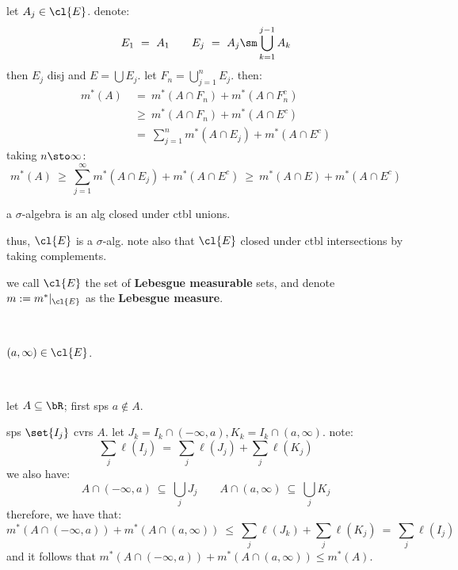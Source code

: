 \begin{pf}
	let $A_{j}\in\cl{E}$. denote:
	\begin{equation*}
		E_{1} \ = \ A_{1} \qquad E_{j} \ = \ A_{j}\sm \bigcup_{k=1}^{j-1}A_{k}
	\end{equation*}
	then $E_{j}$ disj and $E=\bigcup E_{j}$.
	let $F_{n}=\bigcup_{j=1}^{n}E_{j}$. then:
	\begin{align*}
		m^{*}(A)
		& \ = \ m^{*}(A\cap F_{n}) + m^{*}(A\cap F_{n}^{c}) \\
		& \ \geq \ m^{*}(A\cap F_{n}) + m^{*}(A\cap E^{c}) \\
		& \ = \ \sum_{j=1}^{n}m^{*}(A\cap E_{j}) + m^{*}(A\cap E^{c})
	\end{align*}
	taking $n\sto\infty$:
	\begin{equation*}
		m^{*}(A) \ \geq \ \sum_{j=1}^{\infty}m^{*}(A\cap E_{j})+m^{*}(A\cap E^{c})
		\ \geq \ m^{*}(A\cap E) + m^{*}(A\cap E^{c})
	\end{equation*}
\end{pf}

\begin{defn}
	a $\sigma$-algebra is an alg closed under ctbl unions.
\end{defn}
thus, $\cl{E}$ is a $\sigma$-alg.
note also that $\cl{E}$ closed under ctbl intersections by taking complements.

\begin{defn}
	we call $\cl{E}$ the set of \textbf{Lebesgue measurable} sets, and denote $m:=m^{*}\rvert_{\cl{E}}$
	as the \textbf{Lebesgue measure}.
\end{defn} \

\begin{lm}
	$(a,\infty)\in\cl{E}$.
\end{lm} \

\begin{pf}
	let $A\subseteq\bR$; first sps $a\notin A$.

	sps $\set{I_{j}}$ cvrs $A$.
	let $J_{k}=I_{k}\cap(-\infty,a),K_{k}=I_{k}\cap(a,\infty)$.
	note:
	\begin{equation*}
		\sum_{j}\ell(I_{j}) \ = \ \sum_{j}\ell(J_{j})+\sum_{j}\ell(K_{j})
	\end{equation*}
	we also have:
	\begin{equation*}
		A\cap(-\infty,a) \ \subseteq \ \bigcup_{j}J_{j} \qquad
		A\cap(a,\infty) \ \subseteq \ \bigcup_{j}K_{j}
	\end{equation*}
	therefore, we have that:
	\begin{equation*}
		m^{*}(A\cap(-\infty,a))+m^{*}(A\cap(a,\infty))
		\ \leq \ \sum_{j}\ell(J_{k})+\sum_{j}\ell(K_{j}) \ = \ \sum_{j}\ell(I_{j})
	\end{equation*}
	and it follows that $m^{*}(A\cap(-\infty,a))+m^{*}(A\cap(a,\infty)) \leq m^{*}(A)$.
\end{pf}

